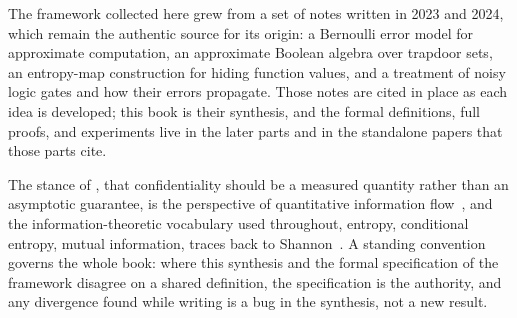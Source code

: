 The framework collected here grew from a set of notes written in 2023 and
2024, which remain the authentic source for its origin: a Bernoulli error
model for approximate computation, an approximate Boolean algebra over
trapdoor sets, an entropy-map construction for hiding function values, and
a treatment of noisy logic gates and how their errors propagate. Those
notes are cited in place as each idea is developed; this book is their
synthesis, and the formal definitions, full proofs, and experiments live in
the later parts and in the standalone papers that those parts cite.

The stance of , that confidentiality
should be a measured quantity rather than an asymptotic guarantee, is the
perspective of quantitative information
flow~\cite{smith2009foundations,alvim2020science}, and the
information-theoretic vocabulary used throughout, entropy, conditional
entropy, mutual information, traces back to
Shannon~\cite{shannon1949communication}. A standing convention governs the
whole book: where this synthesis and the formal specification of the
framework disagree on a shared definition, the specification is the
authority, and any divergence found while writing is a bug in the
synthesis, not a new result.
